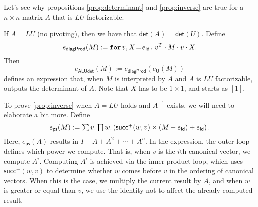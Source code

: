 Let's see why propositions \ref{prop:determinant} and \ref{prop:inverse} are true for a $n\times n$ matrix $A$ that is $LU$ factorizable.

If $A=LU$ (no pivoting), then we have that $\mathsf{det}(A)=\mathsf{det}(U)$. Define
$$
e_{\mathsf{diagProd}}(M):= \initf{e_{\mathsf{Id}}}{v}{X}v^T\cdot M \cdot v \cdot X.
$$
Then
$$
e_{\mathsf{ALUdet}}(M):=  e_{\mathsf{diagProd}}\left( e_{\mathsf{U}}(M) \right)
$$
defines an expression that, when $M$ is interpreted by $A$ and $A$ is $LU$ factorizable, outputs the determinant of $A$. Note that $X$ has to be $1\times 1$, and starts as $[1]$.

To prove \ref{prop:inverse} when $A=LU$ holds and $A^{-1}$ exists, we will need to elaborate a bit more.
Define
$$
e_{\mathsf{ps}}(M):=\ssum v.\sprod w. \left( \mathsf{succ}^+(w,v)\times (M-e_{\mathsf{Id}}) + e_{\mathsf{Id}} \right).
$$
Here, $e_{\mathsf{ps}}(A)$ results in $I+A+A^2+\cdots + A^n$. In the expression, the outer loop defines which power we compute. 
That is, when $v$ is the $i$th canonical vector, we compute $A^i$.
Computing $A^i$ is achieved via the inner product loop, which uses $\mathsf{succ}^+(w,v)$ to 
determine whether $w$ comes before $v$ in the ordering of canonical vectors.
When this is the case, we multiply the current result by $A$, and when $w$ is greater or 
equal than $v$, we use the identity not to affect the already computed result.

